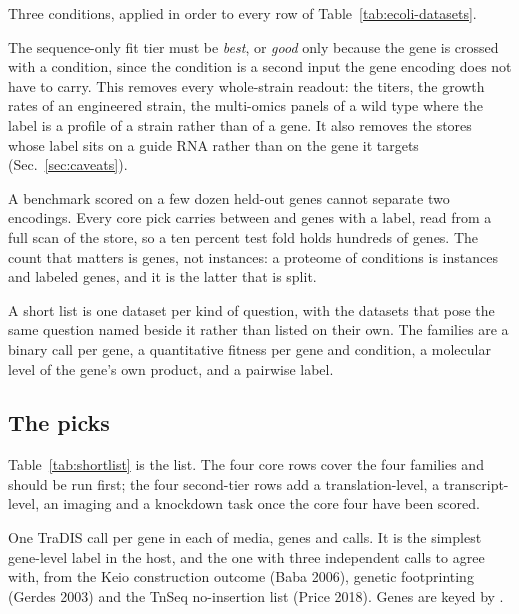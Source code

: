 Three conditions, applied in order to every row of Table~\ref{tab:ecoli-datasets}.

 The sequence-only fit tier must be
\emph{best}, or \emph{good} only because the gene is crossed with a condition, since the
condition is a second input the gene encoding does not have to carry. This removes
every whole-strain readout: the titers, the growth rates of an engineered strain, the
multi-omics panels of a wild type where the label is a profile of a strain rather than
of a gene. It also removes the \guideStoreCount{} stores whose label sits on a guide
RNA rather than on the gene it targets (Sec.~\ref{sec:caveats}).

 A benchmark scored on a few dozen
held-out genes cannot separate two encodings. Every core pick carries between
\coreGenesMin{} and \coreGenesMax{} genes with a label, read from a full scan of the
store, so a ten percent test fold holds hundreds of genes. The count that matters is
genes, not instances: a proteome of \schmidtEnv{} conditions is \schmidtInstances{}
instances and \schmidtGenes{} labeled genes, and it is the latter that is split.

 A short list is one dataset per kind of question,
with the datasets that pose the same question named beside it rather than listed on
their own. The families are a binary call per gene, a quantitative fitness per gene
and condition, a molecular level of the gene's own product, and a pairwise label.

\subsection{The picks}

Table~\ref{tab:shortlist} is the list. The four core rows cover the four families and
should be run first; the four second-tier rows add a translation-level, a
transcript-level, an imaging and a knockdown task once the core four have been scored.

 One TraDIS call per gene in each of
\goodallEnv{} media, \goodallGenes{} genes and \goodallLabels{} calls.
It is the simplest gene-level label in the host, and the one with three independent
calls to agree with, from the Keio construction outcome (Baba 2006), genetic
footprinting (Gerdes 2003) and the TnSeq no-insertion list (Price 2018). Genes are
keyed by \goodallIdentifier{}.

